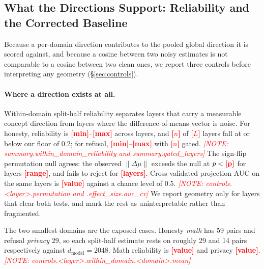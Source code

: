\documentclass[11pt]{article}
\newcommand{\PH}[1]{\textcolor{red}{\textbf{[#1]}}}
\newcommand{\phnote}[1]{\textcolor{red}{\footnotesize\textit{[NOTE: #1]}}}
\newcommand{\dmodel}{d_{\text{model}}}
\begin{document}
\subsection{What the Directions Support: Reliability and the Corrected Baseline}
\label{sec:results-controls}

%

Because a per-domain direction contributes to the pooled global direction it
is scored against, and because a cosine between two noisy estimates is not
comparable to a cosine between two clean ones, we report three controls before
interpreting any geometry (\S\ref{sec:controls}).

\paragraph{Where a direction exists at all.}
Within-domain split-half reliability separates layers that carry a measurable
concept direction from layers where the difference-of-means vector is noise.
For honesty, reliability is \PH{min}--\PH{max} across layers, and
\PH{$n$} of \PH{$L$} layers fall at or below our floor of 0.2; for refusal,
\PH{min}--\PH{max} with \PH{$n$} gated.
\phnote{summary.within\_domain\_reliability and summary.gated\_layers}
The sign-flip permutation null agrees: the observed $\lVert\Delta\mu\rVert$
exceeds the null at $p < \PH{p}$ for layers \PH{range}, and fails to reject
for \PH{layers}. Cross-validated projection AUC on the same layers is
\PH{value} against a chance level of 0.5.
\phnote{controls.<layer>.permutation and .effect\_size.auc\_cv}
We report geometry only for layers that clear both tests, and mark the rest as
uninterpretable rather than fragmented.

The two smallest domains are the exposed cases. Honesty \textit{math} has 59
pairs and refusal \textit{privacy} 29, so each split-half estimate rests on
roughly 29 and 14 pairs respectively against $\dmodel = 2048$. Math reliability
is \PH{value} and privacy \PH{value}.
\phnote{controls.<layer>.within\_domain.<domain>.mean}
\end{document}
